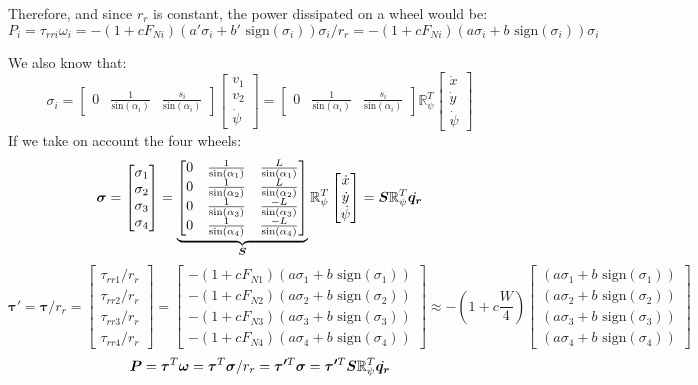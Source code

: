 \documentclass[twoside,onecolumn]{article}
\renewcommand{\vec}[1]{\bm{#1}}
\newcommand{\R}{\mathbb R}
\newcommand{\mat}[2][b]{\begin{#1matrix}#2\end{#1matrix}}
\begin{document}
Therefore, and since $r_r$ is constant, the power dissipated on a wheel would be:
$$P_i = \tau_{rri} \omega_i = -(1 + c F_{Ni})(a' \sigma_i + b'\text{ sign}(\sigma_i)) \sigma_i/r_r = -(1 + c F_{Ni})(a \sigma_i + b\text{ sign}(\sigma_i))\sigma_i$$

We also know that:
$$\sigma_i = \mat{0 & \frac{1}{\text{sin}(\alpha_i)} & \frac{s_i}{\text{sin}(\alpha_i)}}\mat{v_1\\v_2\\ \dot{\psi}} = 
 \mat{0 & \frac{1}{\text{sin}(\alpha_i)} & \frac{s_i}{\text{sin}(\alpha_i)}}\R_{\psi}^T\mat{\dot{x}\\\dot{y}\\ \dot{\psi}}$$
If we take on account the four wheels:
$$\vec{\sigma} = \mat{\sigma_1\\\sigma_2\\\sigma_3\\\sigma_4} = 
\underbrace{\mat{
	0 & \frac{1}{\text{sin}(\alpha_1)} & \frac{L}{\text{sin}(\alpha_1)}\\
	0 & \frac{1}{\text{sin}(\alpha_2)} & \frac{L}{\text{sin}(\alpha_2)}\\
	0 & \frac{1}{\text{sin}(\alpha_3)} & \frac{-L}{\text{sin}(\alpha_3)}\\
	0 & \frac{1}{\text{sin}(\alpha_4)} & \frac{-L}{\text{sin}(\alpha_4)}
}}_{\S}\R_{\psi}^T\mat{\dot{x}\\\dot{y}\\\dot{\psi}} = \S\R_{\psi}^T\dot{\vec{q_r}} $$
$$\vec{\tau'} = \vec{\tau}/r_r  = \mat{\tau_{rr1}/r_r\\\tau_{rr2}/r_r\\\tau_{rr3}/r_r\\\tau_{rr4}/r_r} = 
\mat{
-(1 + c F_{N1})(a \sigma_1 + b\text{ sign}(\sigma_1))\\
-(1 + c F_{N2})(a \sigma_2 + b\text{ sign}(\sigma_2))\\
-(1 + c F_{N3})(a \sigma_3 + b\text{ sign}(\sigma_3))\\
-(1 + c F_{N4})(a \sigma_4 + b\text{ sign}(\sigma_4))
} \approx -(1 + c \frac{W}{4}) \mat{
(a \sigma_1 + b\text{ sign}(\sigma_1))\\
(a \sigma_2 + b\text{ sign}(\sigma_2))\\
(a \sigma_3 + b\text{ sign}(\sigma_3))\\
(a \sigma_4 + b\text{ sign}(\sigma_4))
}$$
$$\vec{P} = \vec{\tau}^T\vec{\omega} = \vec{\tau}^T\vec{\sigma}/r_r = \vec{\tau'}^T\vec{\sigma} = 
\vec{\tau'}^T\S\R_{\psi}^T\dot{\vec{q_r}}$$
\end{document}
